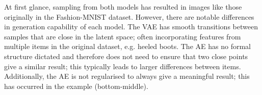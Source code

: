 \documentclass[11pt,a4paper]{article}
\begin{document}
\noindent At first glance, sampling from both models has resulted in images like those originally in the Fashion-MNIST dataset. However, there are notable differences in generation capability of each model. The VAE has smooth transitions between samples that are close in the latent space; often incorporating features from multiple items in the original dataset, e.g. heeled boots. The AE has no formal structure dictated and therefore does not need to ensure that two close points give a similar result; this typically leads to larger differences between items. Additionally, the AE is not regularised to always give a meaningful result; this has occurred in the example (bottom-middle).
\end{document}
